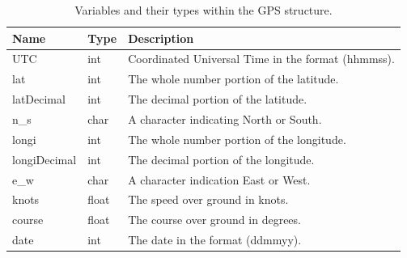 \begin{table}[!hb]
\begin{center}
\caption{Variables and their types within the GPS structure.}
\label{tab:3:GPSstruct}
\begin{tabular}{|l|l|l|}
\hline
\textbf{Name} & \textbf{Type} & \textbf{Description} \\
\hline
UTC & int & Coordinated Universal Time in the format (hhmmss). \\
\hline
lat & int & The whole number portion of the latitude. \\
\hline
latDecimal & int & The decimal portion of the latitude. \\
\hline
n\_s & char & A character indicating North or South. \\
\hline
longi & int & The whole number portion of the longitude. \\
\hline 
longiDecimal & int & The decimal portion of the longitude. \\
\hline 
e\_w & char & A character indication East or West. \\
\hline
knots & float & The speed over ground in knots. \\
\hline
course & float & The course over ground in degrees. \\
\hline
date & int & The date in the format (ddmmyy). \\
\hline
\end{tabular}
\end{center}
\end{table}
